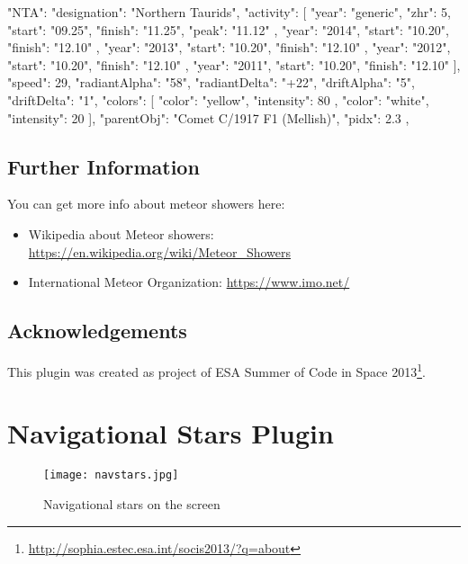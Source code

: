 \begin{configfile}[\footnotesize]
"NTA":
	{
		"designation": "Northern Taurids",
		"activity":
		[
		{
			"year": "generic",
			"zhr": 5,
			"start": "09.25",
			"finish": "11.25",
			"peak": "11.12"
		},
		{
			"year": "2014",
			"start": "10.20",
			"finish": "12.10"
		},
		{
			"year": "2013",
			"start": "10.20",
			"finish": "12.10"
		},
		{
			"year": "2012",
			"start": "10.20",
			"finish": "12.10"
		},
		{
			"year": "2011",
			"start": "10.20",
			"finish": "12.10"
		}
		],
		"speed": 29,
		"radiantAlpha": "58",
		"radiantDelta": "+22",
		"driftAlpha": "5",
		"driftDelta": "1",
		"colors":
		[
		{
			"color": "yellow",
			"intensity": 80
		},
		{
			"color": "white",
			"intensity": 20
		}
		],
		"parentObj": "Comet C/1917 F1 (Mellish)",
		"pidx": 2.3
	},
\end{configfile}

\subsection{Further Information}
\label{sec:plugins:MeteorShowers:Further}

You can get more info about meteor showers here:
\begin{itemize}
\item Wikipedia about Meteor showers: \url{https://en.wikipedia.org/wiki/Meteor_Showers}
\item International Meteor Organization: \url{https://www.imo.net/}
\end{itemize}

\subsection*{Acknowledgements}
This plugin was created as project of ESA Summer of Code in Space 2013\footnote{\url{http://sophia.estec.esa.int/socis2013/?q=about}}.


\newpage

\section{Navigational Stars Plugin}
\label{sec:plugins:NavigationalStars}

\begin{figure}[ht]
\texttt{[image: navstars.jpg]}
\caption{Navigational stars on the screen}
\label{fig:plugin:NavigationalStars}
\end{figure}

